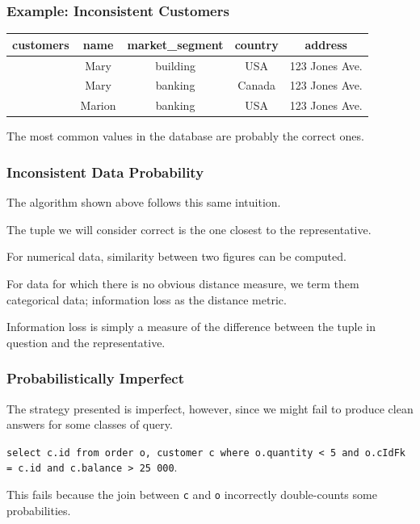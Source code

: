 \begin{frame}
\frametitle{Example: Inconsistent Customers}

\begin{table}[h]\begin{center}
        \begin{tabular}{r | c  c  c  c } 
					customers & name & market\_segment & country & address\\ \hline
	           		 & Mary   & building & USA    & 123 Jones Ave. \\ 
	         		 & Mary   & banking  & Canada & 123 Jones Ave. \\ 
					 & Marion & banking  & USA    & 123 Jones Ave. \\ 
        \end{tabular}
        
\end{center}\end{table}

The most common values in the database are probably the correct ones.

\end{frame}


\begin{frame}
\frametitle{Inconsistent Data Probability}

The algorithm shown above follows this same intuition. 

The tuple we will consider correct is the one closest to the representative. 

For numerical data, similarity between two figures can be computed. 

For data for which there is no obvious distance measure, we term them \alert{categorical data}; information loss as the distance metric.

Information loss is simply a measure of the difference between  the tuple in question and the representative. 

\end{frame}

\begin{frame}
\frametitle{Probabilistically  Imperfect}

The strategy presented is imperfect, however, since we might fail to produce clean answers for some classes of query.

\texttt{select c.id from order o, customer c  where o.quantity < 5 and o.cIdFk = c.id and c.balance > 25~000}. 

This fails because the join between \texttt{c} and \texttt{o} incorrectly double-counts some probabilities.

\end{frame}


